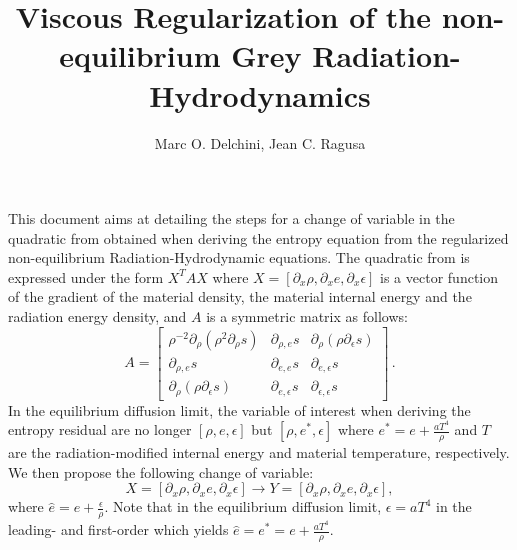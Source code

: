 \documentclass[times,doublespace]{fldauth}%
\begin{document}

\title{Viscous Regularization of the non-equilibrium Grey Radiation-Hydrodynamics}

\author{Marc O. Delchini, Jean C. Ragusa\corrauth{}}

\address{Department of Nuclear Engineering, Texas A\&M University, College Station, TX 77843, USA}


\maketitle

This document aims at detailing the steps for a change of variable in the quadratic from obtained when deriving the entropy equation from the regularized non-equilibrium Radiation-Hydrodynamic equations. The quadratic from is expressed under the form $X^T A X$ where $X=\left[ \partial_x \rho, \partial_x e,  \partial_x \epsilon \right]$ is a vector function of the gradient of the material density, the material internal energy and the radiation energy density, and $A$ is a symmetric matrix as follows:
%
 \begin{equation}
 A = 
\begin{bmatrix}
\rho^{-2}\partial_{\rho} \left( \rho^2 \partial_{\rho} s \right) & \partial_{\rho,e} s & \partial_{\rho} \left( \rho \partial_{\epsilon} s \right) \\
 \partial_{\rho,e} s & \partial_{e,e} s & \partial_{e,\epsilon} s \\
 \partial_{\rho} \left( \rho \partial_{\epsilon} s \right) & \partial_{e,\epsilon} s & \partial_{\epsilon,\epsilon} s
\end{bmatrix}
\,.
\end{equation}
%
In the equilibrium diffusion limit, the variable of interest when deriving the entropy residual are no longer $\left[\rho, e, \epsilon \right]$ but $\left[ \rho, e^*, \epsilon \right]$ where $e^* = e + \frac{aT^4}{\rho}$ and $T$ are the radiation-modified internal energy and material temperature, respectively. We then propose the following change of variable:
%
\begin{equation}\label{eq:chge_var}
X=\left[ \partial_x \rho, \partial_x e,  \partial_x \epsilon \right] \rightarrow Y=\left[ \partial_x \rho, \partial_x \hat{e},  \partial_x \epsilon \right], 
\end{equation}
%
where $\hat{e} = e + \frac{\epsilon}{\rho}$. Note that in the equilibrium diffusion limit, $\epsilon = a T^4$ in the leading- and first-order which yields $\hat{e} = e^* = e + \frac{a T^4}{\rho}$.
\end{document}
